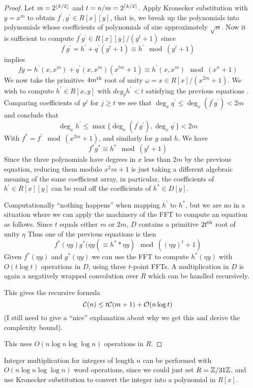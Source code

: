 \begin{proof}
    Let $m = 2^{\left \lfloor k / 2 \right \rfloor}$ and $t = n/m = 2^{\left \lceil k/2 \right \rceil}$. Apply Kronecker substitution with $y = x^m$ to obtain $f^\prime, g^\prime \in R[x][y]$, that is, we break up the polynomials into polynomials whose coefficients of polynomials of size approximately $\sqrt{n}$. Now it is sufficient to compute $f^\prime g^\prime \in R[x][y] /(y^t + 1)$ since
    \[
        f^\prime g^\prime = h^\prime + q^\prime (y^t + 1) \equiv h^\prime \mod (y^t + 1)
    \]
    implies
    \[
        fg = h^\prime (x, x^m) + q^\prime(x, x^m)(x^{tm} + 1) \equiv h^\prime(x, x^m) \mod (x^n + 1)
    \]
    We now take the primitive $4m^{\textrm{th}}$ root of unity $\omega = x \in R[x] / (x^{2m} + 1)$. We wish to compute $h^\prime \in R[x, y]$ with $deg_y h^\prime < t$ satisfying the previous equations . Comparing coefficients of $y^j$ for $j \ge t$ we see that $\deg_x q^\prime \le \deg_x (f^\prime g^\prime) < 2m$ and conclude that 
    \[
        \deg_x h^\prime \le \max \{ \deg_x(f^\prime g^\prime), \deg_x q^\prime \} < 2m
    \]
    With $f^\ast = f^\prime \mod (x^{2m} + 1)$, and similarly for $g$ and $h$. We have
    \[
        f^\ast g^\ast \equiv h^\ast \mod (y^t + 1) 
    \]
    Since the three polynomials have degrees in $x$ less than $2m$ by the previous equation, reducing them modulo $x^2m + 1$ is just taking a different algebraic meaning of the same coefficient array, in particular, the coefficients of $h^\prime \in R[x][y]$ can be read off the coefficients of $h^\ast \in D[y]$.

    Computationally ``nothing happens'' when mapping $h^\prime$ to $h^\ast$, but we are no in a situation where we can apply the machinery of the FFT to compute an equation as follows. Since $t$ equals either $m$ or $2m$, $D$ contains a primitive $2t^{\textrm{th}}$ root of unity $\eta$
    Thus one of the previous equations is then
    \[
        f^\ast(\eta y)g^\ast(\eta y( \equiv h^\ast*\eta y) \mod ((\eta y)^t + 1)
    \]
    Given $f^\ast(\eta y)$ and $g^\ast(\eta y)$ we can use the FFT to compute $h^\ast(\eta y)$ with $O(t \log t)$ operations in $D$, using three $t$-point FFTs. A multiplication in $D$ is again a negatively wrapped convolution over $R$ which can be handled recursively.

    This gives the recursive formula
    \[
        \mathcal C(n) \le t\mathcal C(m + 1) + \mathcal O(n\log t)
    \]
    (I still need to give a ``nice'' explanation about why we get this and derive the complexity bound).
    
    This uses $O(n \log n \log \log n)$ operations in $R$.
\end{proof}

Integer multiplication for integers of length $n$ can be performed with $O(n \log n \log \log n)$ word operations, since we could just set $R = {\mathbb Z} / 31{\mathbb Z}$, and use Kronecker substitution to convert the integer into a polynomial in $R[x]$.
